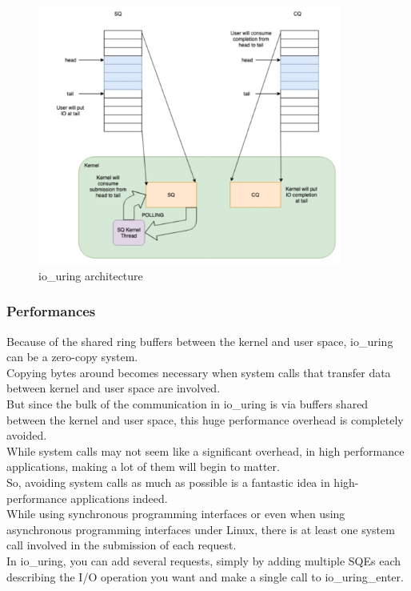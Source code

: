 \documentclass[10pt, oneside,english]{article}   	%
\begin{document}
\begin{figure}[H]
    \centering
    \includegraphics[width=10cm]{images/io_uring.jpg}
    \caption{io\_uring architecture}
    \label{fig:io\_uring architecture}
\end{figure}

\subsubsection{Performances}

Because of the shared ring buffers between the kernel and user space, io\_uring can be a zero-copy system.\\ Copying bytes around becomes necessary when system calls that transfer data between kernel and user space are involved.\\
But since the bulk of the communication in io\_uring is via buffers shared between the kernel and user space, this huge performance overhead is completely avoided.\\ 
While system calls may not seem like a significant overhead, in high performance applications, making a lot of them will begin to matter. \\
So, avoiding system calls as much as possible is a fantastic idea in high-performance applications indeed. \\
While using synchronous programming interfaces or even when using asynchronous programming interfaces under Linux, there is at least one system call involved in the submission of each request.\\
In io\_uring, you can add several requests, simply by adding multiple SQEs each describing the I/O operation you want and make a single call to io\_uring\_enter.
\end{document}
